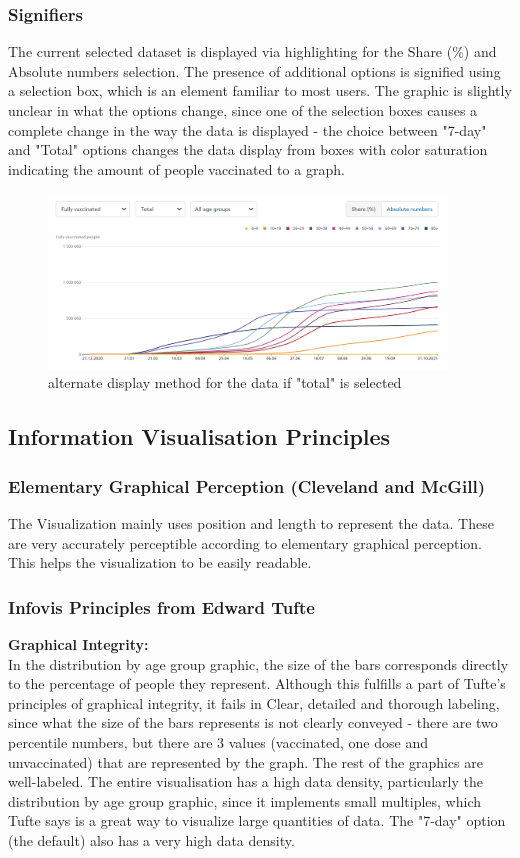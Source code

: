 \documentclass[12pt, letterpaper]{article}
\begin{document}
\subsubsection{Signifiers}
The current selected dataset is displayed via highlighting for the Share (\%) and Absolute numbers selection. The presence of additional options is signified using a selection box, which is an element familiar to most users. The graphic is slightly unclear in what the options change, since one of the selection boxes causes a complete change in the way the data is displayed - the choice between "7-day" and "Total" options changes the data display from boxes with color saturation indicating the amount of people vaccinated to a graph.
\begin{figure}[h]
    \centering
    \includegraphics[width=400px]{images/Screenshot_20211106_140017.png}
    \caption{alternate display method for the data if "total" is selected}
    \label{fig:my_label}
\end{figure}

\subsection{Information Visualisation Principles}
\subsubsection{Elementary Graphical Perception (Cleveland and McGill)}
The Visualization mainly uses position and length to represent the data. These are very accurately perceptible according to elementary graphical perception. This helps the visualization to be easily readable.
\subsubsection{Infovis Principles from Edward Tufte}
\textbf{Graphical Integrity:} \\
In the distribution by age group graphic, the size of the bars corresponds directly to the percentage of people they represent. Although this fulfills a part of Tufte's principles of graphical integrity, it fails in Clear, detailed and thorough labeling, since what the size of the bars represents is not clearly conveyed - there are two percentile numbers, but there are 3 values (vaccinated, one dose and unvaccinated) that are represented by the graph. The rest of the graphics are well-labeled. The entire visualisation has a high data density, particularly the distribution by age group graphic, since it implements small multiples, which Tufte says is a great way to visualize large quantities of data. The "7-day" option (the default) also has a very high data density.
\end{document}
